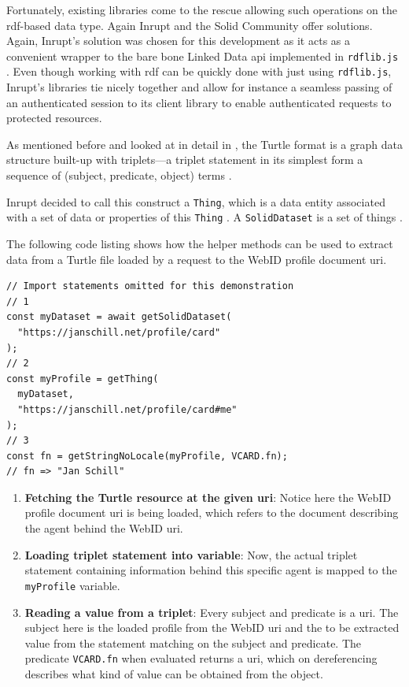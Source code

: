 Fortunately, existing libraries come to the rescue allowing such operations on the \gls{rdf}-based data type. Again Inrupt and the Solid Community offer solutions. Again, Inrupt's solution was chosen for this development as it acts as a convenient wrapper to the bare bone Linked Data \gls{api} implemented in \texttt{rdflib.js} \cite{rdflib-js}. Even though working with \gls{rdf} can be quickly done with just using \texttt{rdflib.js}, Inrupt's libraries tie nicely together and allow for instance a seamless passing of an authenticated session to its client library to enable authenticated requests to protected resources.

As mentioned before and looked at in detail in \cite{cern-solid-investigation-spec}, the Turtle format is a graph data structure built-up with triplets---a triplet statement in its simplest form a sequence of (subject, predicate, object) terms \cite{Prud:hommeaux:14:RT}. 

Inrupt decided to call this construct a \texttt{Thing}, which is a data entity associated with a set of data or properties of this \texttt{Thing} \cite{inrupt-thing}. A \texttt{SolidDataset} is a set of things \cite{inrupt-dataset}.

The following code listing shows how the helper methods can be used to extract data from a Turtle file loaded by a request to the WebID profile document \gls{uri}.

\begin{lstlisting}[language=Other,columns=fullflexible, caption={Basic usage of Inrupt's solid-client library.}, label={lst:2}]
// Import statements omitted for this demonstration
// 1
const myDataset = await getSolidDataset(
  "https://janschill.net/profile/card"
);
// 2
const myProfile = getThing(
  myDataset,
  "https://janschill.net/profile/card#me"
);
// 3
const fn = getStringNoLocale(myProfile, VCARD.fn);
// fn => "Jan Schill"
\end{lstlisting}

\begin{enumerate}
    \item \textbf{Fetching the Turtle resource at the given \gls{uri}}: Notice here the WebID profile document \gls{uri} is being loaded, which refers to the document describing the agent behind the WebID \gls{uri}.
    \item \textbf{Loading triplet statement into variable}: Now, the actual triplet statement containing information behind this specific agent is mapped to the \texttt{myProfile} variable.
    \item \textbf{Reading a value from a triplet}: Every subject and predicate is a \gls{uri}. The subject here is the loaded profile from the WebID \gls{uri} and the to be extracted value from the statement matching on the subject and predicate. The predicate \texttt{VCARD.fn} when evaluated returns a \gls{uri}, which on dereferencing describes what kind of value can be obtained from the object.
\end{enumerate}

